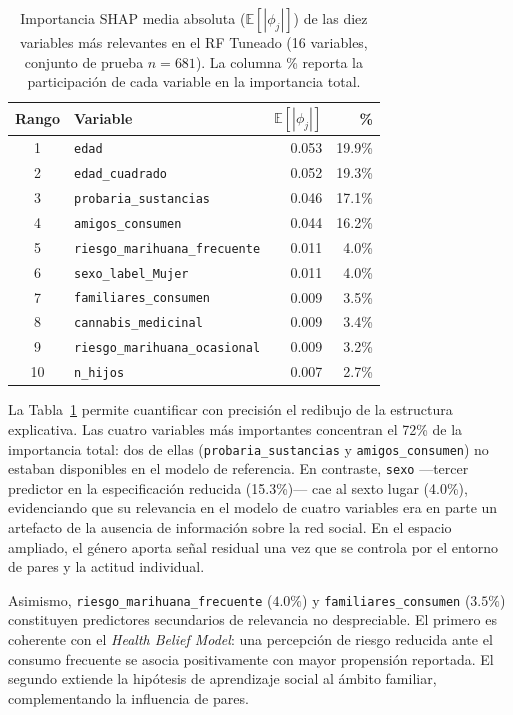 \documentclass[12pt, a4paper]{article}
\begin{document}
\begin{table}[H]
\centering
\small
\caption{Importancia SHAP media absoluta ($\mathbb{E}[|\phi_j|]$) de las diez variables más relevantes en el RF Tuneado (16 variables, conjunto de prueba $n=681$). La columna \% reporta la participación de cada variable en la importancia total.}
\label{tab:shap_top10}
\begin{tabular}{clrr}
\toprule
Rango & Variable & $\mathbb{E}[|\phi_j|]$ & \% \\
\midrule
1 & \texttt{edad}                         & 0.053 & 19.9\% \\
2 & \texttt{edad\_cuadrado}               & 0.052 & 19.3\% \\
3 & \texttt{probaria\_sustancias}         & 0.046 & 17.1\% \\
4 & \texttt{amigos\_consumen}             & 0.044 & 16.2\% \\
5 & \texttt{riesgo\_marihuana\_frecuente} & 0.011 &  4.0\% \\
6 & \texttt{sexo\_label\_Mujer}           & 0.011 &  4.0\% \\
7 & \texttt{familiares\_consumen}         & 0.009 &  3.5\% \\
8 & \texttt{cannabis\_medicinal}          & 0.009 &  3.4\% \\
9 & \texttt{riesgo\_marihuana\_ocasional} & 0.009 &  3.2\% \\
10 & \texttt{n\_hijos}                    & 0.007 &  2.7\% \\
\bottomrule
\end{tabular}
\end{table}

La Tabla~\ref{tab:shap_top10} permite cuantificar con precisión el redibujo de la estructura explicativa. Las cuatro variables más importantes concentran el 72\% de la importancia total: dos de ellas (\texttt{probaria\_sustancias} y \texttt{amigos\_consumen}) no estaban disponibles en el modelo de referencia. En contraste, \texttt{sexo} —tercer predictor en la especificación reducida (15.3\%)— cae al sexto lugar (4.0\%), evidenciando que su relevancia en el modelo de cuatro variables era en parte un artefacto de la ausencia de información sobre la red social. En el espacio ampliado, el género aporta señal residual una vez que se controla por el entorno de pares y la actitud individual.

Asimismo, \texttt{riesgo\_marihuana\_frecuente} ($4.0\%$) y \texttt{familiares\_consumen} ($3.5\%$) constituyen predictores secundarios de relevancia no despreciable. El primero es coherente con el \textit{Health Belief Model}: una percepción de riesgo reducida ante el consumo frecuente se asocia positivamente con mayor propensión reportada. El segundo extiende la hipótesis de aprendizaje social al ámbito familiar, complementando la influencia de pares.
\end{document}
